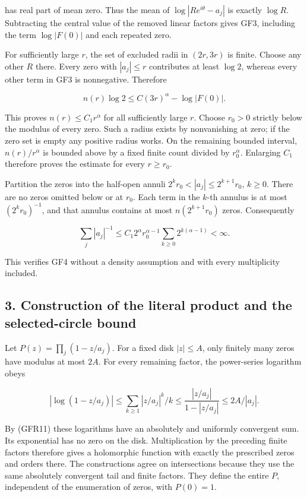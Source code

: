 has real part of mean zero. Thus the mean of \(\log|Re^{i\theta}-a_j|\) is exactly \(\log R\). Subtracting the central value of the removed linear factors gives GF3, including the term \(\log|F(0)|\) and each repeated zero.

For sufficiently large \(r\), the set of excluded radii in \((2r,3r)\) is finite. Choose any other \(R\) there. Every zero with \(|a_j|\le r\) contributes at least \(\log2\), whereas every other term in GF3 is nonnegative. Therefore

\[
n(r)\log2\le C(3r)^\alpha-\log|F(0)|.
\tag{GFR10}
\]

This proves \(n(r)\le C_1r^\alpha\) for all sufficiently large \(r\). Choose \(r_0>0\) strictly below the modulus of every zero. Such a radius exists by nonvanishing at zero; if the zero set is empty any positive radius works. On the remaining bounded interval, \(n(r)/r^\alpha\) is bounded above by a fixed finite count divided by \(r_0^\alpha\). Enlarging \(C_1\) therefore proves the estimate for every \(r\ge r_0\).

Partition the zeros into the half-open annuli \(2^kr_0<|a_j|\le2^{k+1}r_0\), \(k\ge0\). There are no zeros omitted below or at \(r_0\). Each term in the \(k\)-th annulus is at most \((2^kr_0)^{-1}\), and that annulus contains at most \(n(2^{k+1}r_0)\) zeros. Consequently

\[
\sum_j|a_j|^{-1}
\le C_1 2^\alpha r_0^{\alpha-1}
\sum_{k\ge0}2^{k(\alpha-1)}<\infty.
\tag{GFR11}
\]

This verifies GF4 without a density assumption and with every multiplicity included.

\subsection{3. Construction of the literal product and the selected-circle bound}\label{construction-of-the-literal-product-and-the-selected-circle-bound}

Let \(P(z)=\prod_j(1-z/a_j)\). For a fixed disk \(|z|\le A\), only finitely many zeros have modulus at most \(2A\). For every remaining factor, the power-series logarithm obeys

\[
|\log(1-z/a_j)|
\le\sum_{k\ge1}|z/a_j|^k/k
\le\frac{|z/a_j|}{1-|z/a_j|}\le2A/|a_j|.
\tag{GFR12}
\]

By (GFR11) these logarithms have an absolutely and uniformly convergent sum. Its exponential has no zero on the disk. Multiplication by the preceding finite factors therefore gives a holomorphic function with exactly the prescribed zeros and orders there. The constructions agree on intersections because they use the same absolutely convergent tail and finite factors. They define the entire \(P\), independent of the enumeration of zeros, with \(P(0)=1\).

